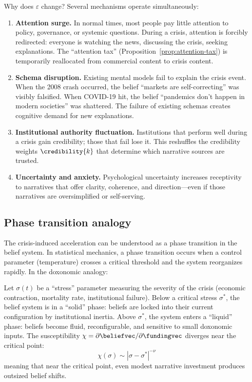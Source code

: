 Why does $\varepsilon$ change?
Several mechanisms operate simultaneously:

\begin{enumerate}
  \item \textbf{Attention surge.}
  In normal times, most people pay little attention to policy, governance, or systemic questions.
  During a crisis, attention is forcibly redirected: everyone is watching the news, discussing the crisis, seeking explanations.
  The ``attention tax'' (Proposition~\ref{prop:attention-tax}) is temporarily reallocated from commercial content to crisis content.

  \item \textbf{Schema disruption.}
  Existing mental models fail to explain the crisis event.
  When the 2008 crash occurred, the belief ``markets are self-correcting'' was visibly falsified.
  When COVID-19 hit, the belief ``pandemics don't happen in modern societies'' was shattered.
  The failure of existing schemas creates cognitive demand for new explanations.

  \item \textbf{Institutional authority fluctuation.}
  Institutions that perform well during a crisis gain credibility; those that fail lose it.
  This reshuffles the credibility weights $\credibility{k}$ that determine which narrative sources are trusted.

  \item \textbf{Uncertainty and anxiety.}
  Psychological uncertainty increases receptivity to narratives that offer clarity, coherence, and direction---even if those narratives are oversimplified or self-serving.
\end{enumerate}

\subsection{Phase transition analogy}

The crisis-induced acceleration can be understood as a phase transition in the belief system.
In statistical mechanics, a phase transition occurs when a control parameter (temperature) crosses a critical threshold and the system reorganizes rapidly.
In the doxonomic analogy:

\begin{proposition}
\label{prop:phase-transition}
Let $\sigma(t)$ be a ``stress'' parameter measuring the severity of the crisis (economic contraction, mortality rate, institutional failure).
Below a critical stress $\sigma^*$, the belief system is in a ``solid'' phase: beliefs are locked into their current configuration by institutional inertia.
Above $\sigma^*$, the system enters a ``liquid'' phase: beliefs become fluid, reconfigurable, and sensitive to small doxonomic inputs.
The susceptibility $\chi = \partial \beliefvec / \partial \fundingvec$ diverges near the critical point:
\[
  \chi(\sigma) \sim |\sigma - \sigma^*|^{-\nu}
\]
meaning that near the critical point, even modest narrative investment produces outsized belief shifts.
\end{proposition}

